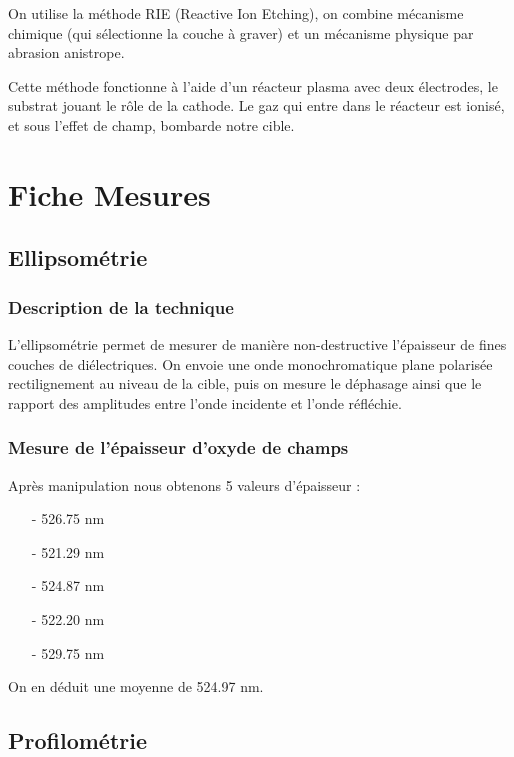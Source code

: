 \documentclass[11pt]{article}
\begin{document}
On utilise la m\'ethode RIE (Reactive Ion Etching), on combine m\'ecanisme chimique (qui s\'electionne la couche \`a graver) et un m\'ecanisme physique par abrasion anistrope.

Cette m\'ethode fonctionne \`a l'aide d'un r\'eacteur plasma avec deux \'electrodes, le substrat jouant le rôle de la cathode. Le gaz qui entre dans le r\'eacteur est ionis\'e, et sous l'effet de champ, bombarde notre cible.


\clearpage

\section{Fiche Mesures}

\subsection{Ellipsom\'etrie}

\subsubsection{Description de la technique }

L'ellipsom\'etrie permet de mesurer de mani\`ere non-destructive l'\'epaisseur de fines couches de di\'electriques. On envoie une onde monochromatique plane polaris\'ee rectilignement au niveau de la cible, puis on mesure le d\'ephasage ainsi que le rapport des amplitudes entre l'onde incidente et l'onde r\'efl\'echie. 

\subsubsection{Mesure de l'\'epaisseur d'oxyde de champs}

Apr\`es manipulation nous obtenons 5 valeurs d'\'epaisseur :
\begin{itemize} \itemsep -6pt
\item[-] 526.75 nm
\item[-] 521.29 nm
\item[-] 524.87 nm
\item[-] 522.20 nm 
\item[-] 529.75 nm
\end{itemize}
On en d\'eduit une moyenne de 524.97 nm.

\subsection{Profilom\'etrie}
\end{document}
